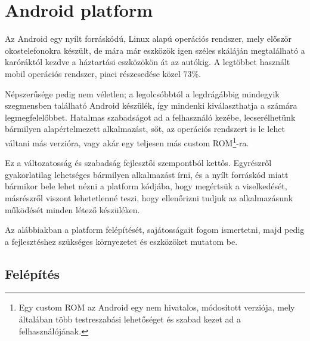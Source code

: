 \chapter{Android platform}

Az Android egy nyílt forráskódú, Linux alapú operációs rendszer, mely először okostelefonokra készült, de mára már eszközök igen széles skáláján megtalálható a karóráktól kezdve a háztartási eszközökön át az autókig. A legtöbbet használt mobil operációs rendszer, piaci részesedése közel 73\%.\cite{ShareStat}

Népszerűsége pedig nem véletlen; a legolcsóbbtól a legdrágábbig mindegyik szegmensben található Android készülék, így mindenki kiválaszthatja a számára legmegfelelőbbet. Hatalmas szabadságot ad a felhasználó kezébe, lecserélhetünk bármilyen alapértelmezett alkalmazást, sőt, az operációs rendszert is le lehet váltani más verzióra, vagy akár egy teljesen más custom ROM\footnote{Egy custom ROM az Android egy nem hivatalos, módosított verziója, mely általában több testreszabási lehetőséget és szabad kezet ad a felhasználójának.}-ra.

Ez a változatosság és szabadság fejlesztői szempontból kettős. Egyrészről gyakorlatilag lehetséges bármilyen alkalmazást írni, és a nyílt forráskód miatt bármikor bele lehet nézni a platform kódjába, hogy megértsük a viselkedését, másrészről viszont lehetetlenné teszi, hogy ellenőrizni tudjuk az alkalmazásunk működését minden létező készüléken.

Az alábbiakban a platform felépítését, sajátosságait fogom ismertetni, majd pedig a fejlesztéshez szükséges környezetet és eszközöket mutatom be.

\section{Felépítés}

